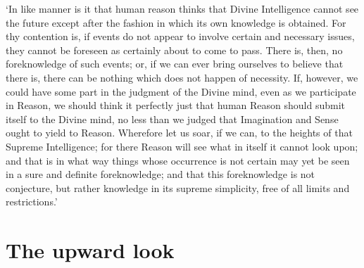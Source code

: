 \documentclass[12pt]{book}
\begin{document}
`In like manner is it that human reason thinks that Divine Intelligence
cannot see the future except after the fashion in which its own
knowledge is obtained. For thy contention is, if events do not appear to
involve certain and necessary issues, they cannot be foreseen as
certainly about to come to pass. There is, then, no foreknowledge of
such events; or, if we can ever bring ourselves to believe that there
is, there can be nothing which does not happen of necessity. If,
however, we could have some part in the judgment of the Divine mind,
even as we participate in Reason, we should think it perfectly just that
human Reason should submit itself to the Divine mind, no less than we
judged that Imagination and Sense ought to yield to Reason. Wherefore
let us soar, if we can, to the heights of that Supreme Intelligence; for
there Reason will see what in itself it cannot look upon; and that is in
what way things whose occurrence is not certain may yet be seen in a
sure and definite foreknowledge; and that this foreknowledge is not
conjecture, but rather knowledge in its supreme simplicity, free of all
limits and restrictions.'



\section{The upward look}
\end{document}
